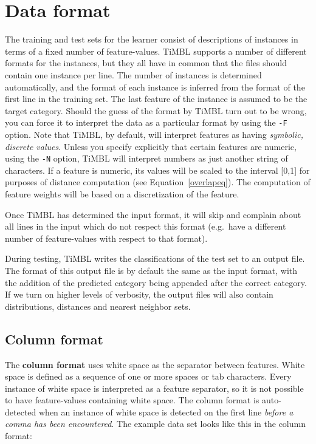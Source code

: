 \documentclass{report}
\begin{document}
\section{Data format}
\label{dataformats}

The training and test sets for the learner consist of descriptions of
instances in terms of a fixed number of feature-values. TiMBL supports
a number of different formats for the instances, but they all have in
common that the files should contain one instance per line. The number
of instances is determined automatically, and the format of each
instance is inferred from the format of the first line in the training
set. The last feature of the instance is assumed to be the target
category. Should the guess of the format by TiMBL turn out to be
wrong, you can force it to interpret the data as a particular format
by using the {\tt -F} option. Note that TiMBL, by default, will
interpret features as having {\em symbolic, discrete values}. Unless
you specify explicitly that certain features are numeric, using the
{\tt -N} option, TiMBL will interpret numbers as just another string
of characters. If a feature is numeric, its values will be scaled to
the interval [0,1] for purposes of distance computation (see
Equation~\ref{overlapeq}). The computation of feature weights will be
based on a discretization of the feature.

Once TiMBL has determined the input format, it will skip and complain
about all lines in the input which do not respect this format
(e.g.~have a different number of feature-values with respect to that
format).

During testing, TiMBL writes the classifications of the test set to an
output file. The format of this output file is by default the same as
the input format, with the addition of the predicted category being
appended after the correct category. If we turn on higher levels of
verbosity, the output files will also contain distributions, distances
and nearest neighbor sets.

\subsection{Column format}
\label{comlumnformat}

The {\bf column format} uses white space as the separator between
features. White space is defined as a sequence of one or more spaces or
tab characters. Every instance of white space is interpreted as a
feature separator, so it is not possible to have feature-values
containing white space. The column format is auto-detected when an
instance of white space is detected on the first line {\em before a
comma has been encountered}. The example data set looks like this in
the column format:
\end{document}
